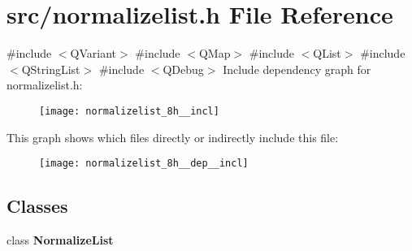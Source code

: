 \section{src/normalizelist.h File Reference}
\label{normalizelist_8h}
{\ttfamily \#include $<$Q\+Variant$>$}\newline
{\ttfamily \#include $<$Q\+Map$>$}\newline
{\ttfamily \#include $<$Q\+List$>$}\newline
{\ttfamily \#include $<$Q\+String\+List$>$}\newline
{\ttfamily \#include $<$Q\+Debug$>$}\newline
Include dependency graph for normalizelist.\+h\+:\nopagebreak
\begin{figure}[H]
\begin{center}
\leavevmode
\texttt{[image: normalizelist\_8h\_\_incl]}
\end{center}
\end{figure}
This graph shows which files directly or indirectly include this file\+:\nopagebreak
\begin{figure}[H]
\begin{center}
\leavevmode
\texttt{[image: normalizelist\_8h\_\_dep\_\_incl]}
\end{center}
\end{figure}
\subsection*{Classes}
\begin{DoxyCompactItemize}
\item 
class \textbf{ Normalize\+List}
\end{DoxyCompactItemize}
